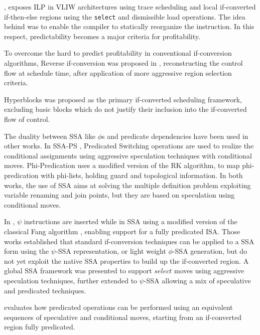 \cite{Rau:2003:IP:1074100.1074489}, exposes ILP in VLIW architectures using trace scheduling and local if-converted if-then-else regions using the \texttt{select} and dismissible load operations. The idea behind was to enable the compiler to statically reorganize the instruction. In this respect, predictability \cite{Fisher:1992:PCB:143371.143493} becomes a major criteria for profitability.

To overcome the hard to predict profitability in conventional if-conversion algorithms, Reverse if-conversion was proposed in \cite{August:1999:PRI:326224.325595}, reconstructing the control flow at schedule time, after application of more aggressive region selection criteria.

Hyperblocks \cite{Mahlke:1992:ECS:144965.144998} was proposed as the primary if-converted scheduling framework, excluding basic blocks which do not justify their inclusion into the if-converted flow of control.

The duality between SSA like $\phi$s and predicate dependencies have been used in other works. In SSA-PS \cite{Jacome01clusteredvliw}, Predicated Switching operations are used to realize the conditional assignments using aggressive speculation techniques with conditional moves. Phi-Predication \cite{Chuang03phi-predicationfor} uses a modified version of the RK algorithm, to map phi-predication with phi-lists, holding guard and topological information. In both works, the use of SSA aims at solving the multiple definition problem exploiting variable renaming and join points, but they are based on speculation using conditional moves. 

In \cite{Stoutchinin_Gao_2004}, $\psi$ instructions are inserted while in SSA using a modified version of the classical Fang algorithm \cite{Fang:1996:CAI:645674.663446}, enabling support for a fully predicated ISA.
Those works established that standard if-conversion techniques can be applied to a SSA form using the $\psi$-SSA representation, or light weight $\phi$-SSA generation, but do not yet exploit the native SSA properties to build up the if-converted region.
A global SSA framework was presented \cite{odes_bruel} to support $select$ moves using aggressive speculation techniques, further extended to $\psi$-SSA \cite{ijes_bruel} allowing a mix of speculative and predicated techniques.

\cite{Mahlke95acomparison} evaluates how predicated operations can be performed using an equivalent sequences of speculative and conditional moves, starting from an if-converted region fully predicated. 










